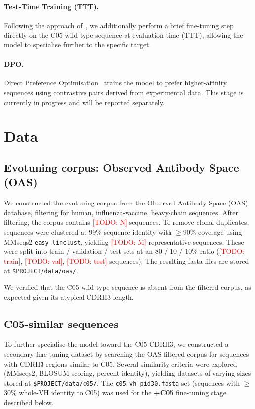 \documentclass[11pt, a4paper]{article}
\newcommand{\todo}[1]{\textcolor{red}{[TODO: #1]}}
\begin{document}
\paragraph{Test-Time Training (TTT).}
Following the approach of~\cite{henighan2024ttt}, we additionally perform a brief fine-tuning step directly on the C05 wild-type sequence at evaluation time (TTT), allowing the model to specialise further to the specific target.

\paragraph{DPO.}
Direct Preference Optimisation~\cite{rafailov2023direct, ferragu2025gdpo} trains the model to prefer higher-affinity sequences using contrastive pairs derived from experimental data. This stage is currently in progress and will be reported separately.


\section{Data}

\subsection{Evotuning corpus: Observed Antibody Space (OAS)}

We constructed the evotuning corpus from the Observed Antibody Space (OAS) database, filtering for human, influenza-vaccine, heavy-chain sequences. After filtering, the corpus contains \todo{N} sequences. To remove clonal duplicates, sequences were clustered at 99\% sequence identity with $\geq$90\% coverage using MMseqs2 \texttt{easy-linclust}, yielding \todo{M} representative sequences. These were split into train / validation / test sets at an 80 / 10 / 10\% ratio (\todo{train}, \todo{val}, \todo{test} sequences). The resulting fasta files are stored at \texttt{\$PROJECT/data/oas/}.

We verified that the C05 wild-type sequence is absent from the filtered corpus, as expected given its atypical CDRH3 length.

\subsection{C05-similar sequences}

To further specialise the model toward the C05 CDRH3, we constructed a secondary fine-tuning dataset by searching the OAS filtered corpus for sequences with CDRH3 regions similar to C05. Several similarity criteria were explored (MMseqs2, BLOSUM scoring, percent identity), yielding datasets of varying sizes stored at \texttt{\$PROJECT/data/c05/}. The \texttt{c05\_vh\_pid30.fasta} set (sequences with $\geq$30\% whole-VH identity to C05) was used for the \textbf{+C05} fine-tuning stage described below.
\end{document}
